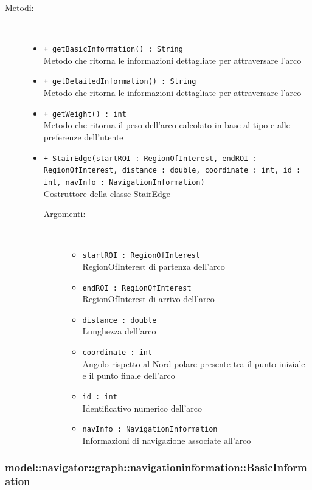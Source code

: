 \documentclass[../DefinizioneDiProdotto.tex]{subfiles}
\begin{document}
\begin{description}
\begin{itemize}
\end{itemize}
\item[Metodi:] \
\begin{itemize}
\item \texttt{+ getBasicInformation() : String}\\
Metodo che ritorna le informazioni dettagliate per attraversare l'arco
 \item \texttt{+ getDetailedInformation() : String}\\
Metodo che ritorna le informazioni dettagliate per attraversare l'arco
 \item \texttt{+ getWeight() : int}\\
Metodo che ritorna il peso dell'arco calcolato in base al tipo e alle preferenze dell'utente
 \item \texttt{+ StairEdge(startROI : RegionOfInterest, endROI : RegionOfInterest, distance : double, coordinate : int, id : int, navInfo : NavigationInformation)}\\
Costruttore della classe StairEdge
 \begin{description}
\item[Argomenti:] \
\begin{itemize}
\item \texttt{startROI : RegionOfInterest}\\
RegionOfInterest di partenza dell'arco\item \texttt{endROI : RegionOfInterest}\\
RegionOfInterest di arrivo dell'arco\item \texttt{distance : double}\\
Lunghezza dell'arco\item \texttt{coordinate : int}\\
Angolo rispetto al Nord polare presente tra il punto iniziale e il punto finale dell'arco\item \texttt{id : int}\\
Identificativo numerico dell'arco\item \texttt{navInfo : NavigationInformation}\\
Informazioni di navigazione associate all'arco\end{itemize}
\end{description}
\end{itemize}
\end{description}

\subsubsection{model::navigator::graph::navigationinformation::BasicInformation}
\end{document}
